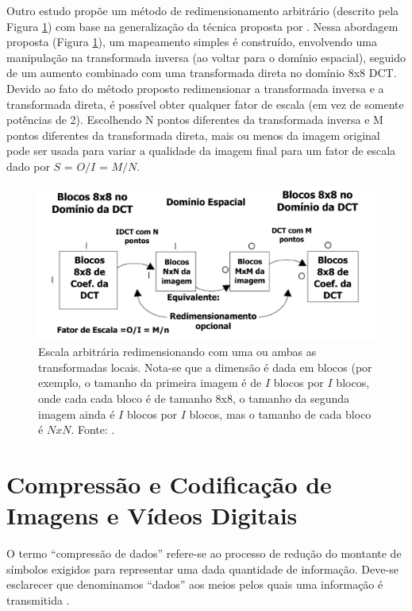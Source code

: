 Outro estudo propõe um método de redimensionamento arbitrário (descrito pela Figura \ref{DCT_RES}) com base na generalização da técnica proposta por \cite{dugad2001fast}. Nessa abordagem proposta (Figura \ref{DCT_RES}), um mapeamento simples é construído, envolvendo uma manipulação na transformada inversa (ao voltar para o domínio espacial), seguido de um aumento combinado com uma transformada direta no domínio 8x8 DCT. Devido ao fato do método proposto redimensionar a transformada inversa e a transformada direta, é possível obter qualquer fator de escala (em vez de somente potências de 2). Escolhendo N pontos diferentes da transformada inversa e M pontos diferentes da transformada direta, mais ou menos da imagem original pode ser usada para variar a qualidade da imagem final para um fator de escala dado por $S$ = $O/I$ = $M/N$. 
\begin{figure}[h]
	\centering
	\includegraphics[scale=0.6]
{figuras/DCT_RES.pdf}
	\caption{Escala arbitrária redimensionando com uma ou ambas as transformadas locais. Nota-se que a dimensão é dada em blocos (por exemplo, o tamanho da primeira imagem é de $I$ blocos por $I$ blocos, onde cada cada bloco é de tamanho 8x8, o tamanho da segunda imagem ainda é $I$ blocos por $I$ blocos, mas o tamanho de cada bloco é $NxN$. Fonte: \cite{salazar2007complexity}.}
	\label{DCT_RES}
\end{figure}

\section{Compressão e Codificação de Imagens e Vídeos Digitais}

O termo \enquote{compressão de dados} refere-se ao processo de redução do montante de símbolos exigidos para representar uma dada quantidade de informação. Deve-se esclarecer que denominamos \enquote{dados} aos meios pelos quais uma informação é transmitida \cite{richardson2011h}.

